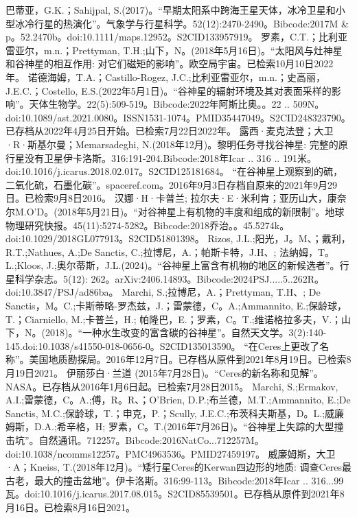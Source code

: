 \begin{enumerate}
 巴蒂亚，G.K.；Sahijpal, S.(2017)。“早期太阳系中跨海王星天体，冰冷卫星和小型冰冷行星的热演化”。气象学与行星科学。52(12):2470-2490。Bibcode:2017M & p。52.2470b。doi:10.1111/maps.12952。S2CID133957919。 
 罗素，C.T.；比利亚雷亚尔，m.n.；Prettyman, T.H.;山下，N。(2018年5月16日)。“太阳风与灶神星和谷神星的相互作用: 对它们磁矩的影响”。欧空局宇宙。已检索10月10日2022年。
 诺德海姆，T.A.；Castillo-Rogez, J.C.;比利亚雷亚尔，m.n.；史高丽，J.E.C.；Costello, E.S.(2022年5月1日)。“谷神星的辐射环境及其对表面采样的影响”。天体生物学。22(5):509-519。Bibcode:2022年阿斯比奥。。22 .. 509N。doi:10.1089/ast.2021.0080。ISSN1531-1074。PMID35447049。S2CID248323790。已存档从2022年4月25日开始。已检索7月22日2022年。   
 露西·麦克法登；大卫·R·斯基尔曼；Memarsadeghi, N.(2018年12月)。黎明任务寻找谷神星: 完整的原行星没有卫星伊卡洛斯。316:191-204.Bibcode:2018年Icar .. 316 .. 191米。doi:10.1016/j.icarus.2018.02.017。S2CID125181684。 
 “在谷神星上观察到的硫，二氧化硫，石墨化碳”。spaceref.com。2016年9月3日存档自原来的2021年9月29日。已检索9月8日2016。
 汉娜·H·卡普兰; 拉尔夫·E·米利肯；亚历山大，康奈尔M.O'D。(2018年5月21日)。“对谷神星上有机物的丰度和组成的新限制”。地球物理研究快报。45(11):5274-5282。Bibcode:2018乔治。。45.5274k。doi:10.1029/2018GL077913。S2CID51801398。 
 Rizos, J.L.;阳光，J。M、；戴利，R.T.;Nathues, A.;De Sanctis, C.;拉博尼，A.；帕斯卡特，J.H、; 法纳姆，T。L.;Kloos, J.;奥尔蒂斯，J.L.(2024)。“谷神星上富含有机物的地区的新候选者”。行星科学杂志。5(12): 262。arXiv:2406.14893。Bibcode:2024PSJ.....5..262R。doi:10.3847/PSJ/ad86ba。
 Marchi, S.;拉博尼，A.；Prettyman, T.H、; De Sanctis，M。C.;卡斯蒂略-罗杰兹，J.；雷蒙德，C。A.;Ammannito, E.;保龄球，T.；Ciarniello, M.;卡普兰，H.; 帕隆巴，E.；罗素，C。T.;维诺格拉多夫，V.；山下，N。(2018)。“一种水生改变的富含碳的谷神星”。自然天文学。3(2):140-145.doi:10.1038/s41550-018-0656-0。S2CID135013590。 
 “在Ceres上更改了名称”。美国地质勘探局。2016年12月7日。已存档从原件到2021年8月19日。已检索8月19日2021。
 伊丽莎白·兰道 (2015年7月28日)。“Ceres的新名称和见解”。NASA。已存档从2016年1月6日起。已检索7月28日2015。
 Marchi, S.;Ermakov, A.I.;雷蒙德，C。A.;傅，R。R、；O'Brien, D.P.;布兰德，M.T.;Ammannito, E.;De Sanctis, M.C.;保龄球，T.；申克，P.；Scully, J.E.C.;布茨科夫斯基，D。L.;威廉姆斯，D.A.;希辛格，H; 罗素，C。T.(2016年7月26日)。“谷神星上失踪的大型撞击坑”。自然通讯。712257。Bibcode:2016NatCo...712257M。doi:10.1038/ncomms12257。PMC4963536。PMID27459197。  
 威廉姆斯，大卫·A；Kneiss, T.(2018年12月)。“矮行星Ceres的Kerwan四边形的地质: 调查Ceres最古老，最大的撞击盆地”。伊卡洛斯。316:99-113。Bibcode:2018年Icar .. 316...99瓦。doi:10.1016/j.icarus.2017.08.015。S2CID85539501。已存档从原件到2021年8月16日。已检索8月16日2021。 

\end{enumerate}
